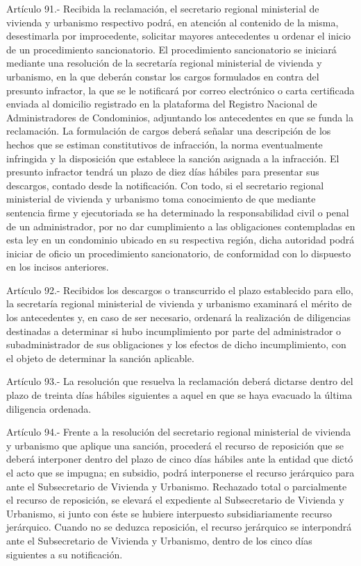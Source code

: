     Artículo 91.- Recibida la reclamación, el secretario regional ministerial de vivienda y urbanismo respectivo podrá, en atención al contenido de la misma, desestimarla por improcedente, solicitar mayores antecedentes u ordenar el inicio de un procedimiento sancionatorio.
    El procedimiento sancionatorio se iniciará mediante una resolución de la secretaría regional ministerial de vivienda y urbanismo, en la que deberán constar los cargos formulados en contra del presunto infractor, la que se le notificará por correo electrónico o carta certificada enviada al domicilio registrado en la plataforma del Registro Nacional de Administradores de Condominios, adjuntando los antecedentes en que se funda la reclamación.
    La formulación de cargos deberá señalar una descripción de los hechos que se estiman constitutivos de infracción, la norma eventualmente infringida y la disposición que establece la sanción asignada a la infracción.
    El presunto infractor tendrá un plazo de diez días hábiles para presentar sus descargos, contado desde la notificación.
    Con todo, si el secretario regional ministerial de vivienda y urbanismo toma conocimiento de que mediante sentencia firme y ejecutoriada se ha determinado la responsabilidad civil o penal de un administrador, por no dar cumplimiento a las obligaciones contempladas en esta ley en un condominio ubicado en su respectiva región, dicha autoridad podrá iniciar de oficio un procedimiento sancionatorio, de conformidad con lo dispuesto en los incisos anteriores.
     
    Artículo 92.- Recibidos los descargos o transcurrido el plazo establecido para ello, la secretaría regional ministerial de vivienda y urbanismo examinará el mérito de los antecedentes y, en caso de ser necesario, ordenará la realización de diligencias destinadas a determinar si hubo incumplimiento por parte del administrador o subadministrador de sus obligaciones y los efectos de dicho incumplimiento, con el objeto de determinar la sanción aplicable.
     
    Artículo 93.- La resolución que resuelva la reclamación deberá dictarse dentro del plazo de treinta días hábiles siguientes a aquel en que se haya evacuado la última diligencia ordenada.
     
    Artículo 94.- Frente a la resolución del secretario regional ministerial de vivienda y urbanismo que aplique una sanción, procederá el recurso de reposición que se deberá interponer dentro del plazo de cinco días hábiles ante la entidad que dictó el acto que se impugna; en subsidio, podrá interponerse el recurso jerárquico para ante el Subsecretario de Vivienda y Urbanismo.
    Rechazado total o parcialmente el recurso de reposición, se elevará el expediente al Subsecretario de Vivienda y Urbanismo, si junto con éste se hubiere interpuesto subsidiariamente recurso jerárquico. Cuando no se deduzca reposición, el recurso jerárquico se interpondrá ante el Subsecretario de Vivienda y Urbanismo, dentro de los cinco días siguientes a su notificación.
     
